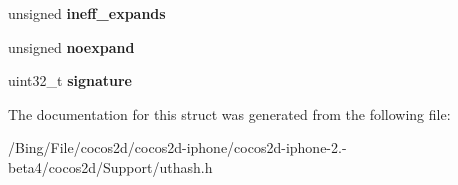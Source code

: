 \begin{DoxyCompactItemize}
\item 
\hypertarget{struct_u_t__hash__table_a216c7d98cf40a0064bee94aa8a5bf1b7}{unsigned {\bfseries ineff\-\_\-expands}}\label{struct_u_t__hash__table_a216c7d98cf40a0064bee94aa8a5bf1b7}

\item 
\hypertarget{struct_u_t__hash__table_a635661789933752e7b83dac84430eae1}{unsigned {\bfseries noexpand}}\label{struct_u_t__hash__table_a635661789933752e7b83dac84430eae1}

\item 
\hypertarget{struct_u_t__hash__table_a87d1ab3f3ede1809c6a485972d20b25f}{uint32\-\_\-t {\bfseries signature}}\label{struct_u_t__hash__table_a87d1ab3f3ede1809c6a485972d20b25f}

\end{DoxyCompactItemize}


The documentation for this struct was generated from the following file\-:\begin{DoxyCompactItemize}
\item 
/\-Bing/\-File/cocos2d/cocos2d-\/iphone/cocos2d-\/iphone-\/2.-\/beta4/cocos2d/\-Support/uthash.\-h\end{DoxyCompactItemize}
